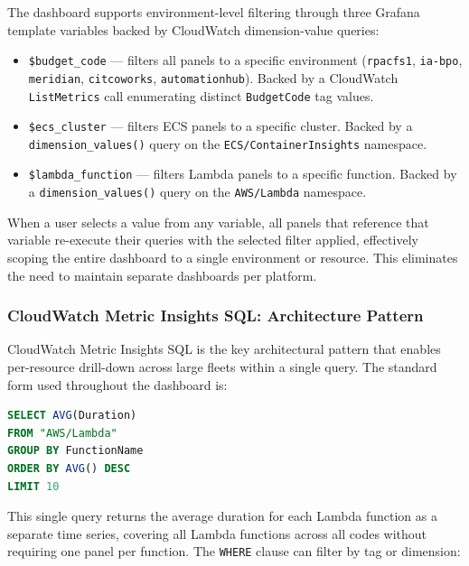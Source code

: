The dashboard supports environment-level filtering through three Grafana
template variables backed by CloudWatch dimension-value queries:

\begin{itemize}
    \item \texttt{\$budget\_code} --- filters all panels to a specific
          environment (\texttt{rpacfs1}, \texttt{ia-bpo}, \texttt{meridian},
          \texttt{citcoworks}, \texttt{automationhub}). Backed by a
          CloudWatch \texttt{ListMetrics} call enumerating distinct
          \texttt{BudgetCode} tag values.

    \item \texttt{\$ecs\_cluster} --- filters ECS panels to a specific
          cluster. Backed by a \texttt{dimension\_values()} query on
          the \texttt{ECS/ContainerInsights} namespace.

    \item \texttt{\$lambda\_function} --- filters Lambda panels to a
          specific function. Backed by a \texttt{dimension\_values()}
          query on the \texttt{AWS/Lambda} namespace.
\end{itemize}

When a user selects a value from any variable, all panels that reference
that variable re-execute their queries with the selected filter applied,
effectively scoping the entire dashboard to a single environment or
resource. This eliminates the need to maintain separate dashboards per
platform.

\subsubsection{CloudWatch Metric Insights SQL: Architecture Pattern}

CloudWatch Metric Insights SQL is the key architectural pattern that
enables per-resource drill-down across large fleets within a single query.
The standard form used throughout the dashboard is:

\begin{lstlisting}[language=SQL, caption={Metric Insights SQL --- Per-Function Lambda Duration Average}]
SELECT AVG(Duration)
FROM "AWS/Lambda"
GROUP BY FunctionName
ORDER BY AVG() DESC
LIMIT 10
\end{lstlisting}

This single query returns the average duration for each Lambda function
as a separate time series, covering all Lambda functions across all
codes without requiring one panel per function. The \texttt{WHERE}
clause can filter by tag or dimension:

